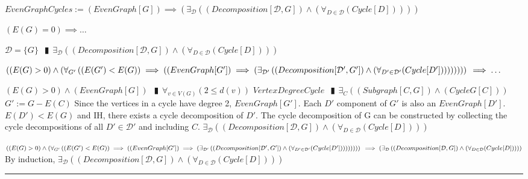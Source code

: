 \documentclass{book}
\newcommand{\abr}{:=}
\newcommand{\pipe}{$\phantom{(}\vrectangleblack\phantom{)}$}
\newcommand{\pr}[1]{\left(#1\right)}
\begin{document}
$EvenGraphCycles \abr (EvenGraph[G]) \implies \pr{\exists_{\mathcal{D}}\pr{(Decomposition[\mathcal{D}, G]) \land \pr{\forall_{D \in \mathcal{D}}(Cycle[D])}}}$
\begin{enumerate}
  \lit $\pr{E(G) = 0} \implies \ldots$
  \begin{enumerate}
    \lit $\mathcal{D} = \{G\}$ \pipe $\exists_{\mathcal{D}}\pr{(Decomposition[\mathcal{D}, G]) \land \pr{\forall_{D \in \mathcal{D}}(Cycle[D])}}$
  \end{enumerate}
  \lit $\pr{\pr{E(G) > 0} \land \pr{\forall_{G'}\pr{\pr{E(G') < E(G)} \implies \pr{(EvenGraph[G']) \implies \pr{\exists_{\mathcal{D}'}\pr{(Decomposition[\mathcal{D}', G']) \land \pr{\forall_{D' \in \mathcal{D}'}(Cycle[D'])}}}}}}} \\
       \implies \ldots$
  \begin{enumerate}
    \lit $\pr{E(G) > 0} \land (EvenGraph[G])$ \pipe $\forall_{v \in V(G)}\pr{2 \leq d(v)}$
    \lit $VertexDegreeCycle$ \pipe $\exists_{C}\pr{(Subgraph[C, G]) \land (CycleG[C])}$
    \lit $G' \abr G - E(C)$
    \lit Since the vertices in a cycle have degree 2, $EvenGraph[G']$. Each $D'$ component of $G'$ is also an $EvenGraph[D']$.
    \lit $E(D') < E(G)$ and IH, there exists a cycle decomposition of $D'$.
    \lit The cycle decomposition of G can be constructed by collecting the cycle decompositions of all $D' \in \mathcal{D}'$ and including $C$.
    \lit $\exists_{\mathcal{D}}\pr{(Decomposition[\mathcal{D}, G]) \land \pr{\forall_{D \in \mathcal{D}}(Cycle[D])}}$
  \end{enumerate}
  \lit $\pr{\pr{E(G) > 0} \land \pr{\forall_{G'}\pr{\pr{E(G') < E(G)} \implies \pr{(EvenGraph[G']) \implies \pr{\exists_{\mathcal{D}'}\pr{(Decomposition[\mathcal{D}', G']) \land \pr{\forall_{D' \in \mathcal{D}'}(Cycle[D'])}}}}}}} \\
       \implies \pr{\exists_{\mathcal{D}}\pr{(Decomposition[\mathcal{D}, G]) \land \pr{\forall_{D \in \mathcal{D}}(Cycle[D])}}}$
  \lit By induction, $\exists_{\mathcal{D}}\pr{(Decomposition[\mathcal{D}, G]) \land \pr{\forall_{D \in \mathcal{D}}(Cycle[D])}}$
\end{enumerate} \vspace{.75mm} \hrule \vspace{.75mm} \ \\ 

\end{document}
